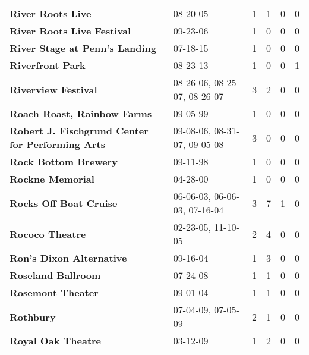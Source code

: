 \begin{supertabular}{llllll}
                                            \textbf{River Roots Live} &                      08-20-05 &  1 &   1 &  0 &  0 \\
                                   \textbf{River Roots Live Festival} &                      09-23-06 &  1 &   0 &  0 &  0 \\
                               \textbf{River Stage at Penn's Landing} &                      07-18-15 &  1 &   0 &  0 &  0 \\
                                             \textbf{Riverfront Park} &                      08-23-13 &  1 &   0 &  0 &  1 \\
                                          \textbf{Riverview Festival} &  08-26-06, 08-25-07, 08-26-07 &  3 &   2 &  0 &  0 \\
                                  \textbf{Roach Roast, Rainbow Farms} &                      09-05-99 &  1 &   0 &  0 &  0 \\
          \textbf{Robert  J.  Fischgrund  Center for Performing Arts} &  09-08-06, 08-31-07, 09-05-08 &  3 &   0 &  0 &  0 \\
                                         \textbf{Rock Bottom Brewery} &                      09-11-98 &  1 &   0 &  0 &  0 \\
                                             \textbf{Rockne Memorial} &                      04-28-00 &  1 &   0 &  0 &  0 \\
                                       \textbf{Rocks Off Boat Cruise} &  06-06-03, 06-06-03, 07-16-04 &  3 &   7 &  1 &  0 \\
                                              \textbf{Rococo Theatre} &            02-23-05, 11-10-05 &  2 &   4 &  0 &  0 \\
                                     \textbf{Ron's Dixon Alternative} &                      09-16-04 &  1 &   3 &  0 &  0 \\
                                           \textbf{Roseland Ballroom} &                      07-24-08 &  1 &   1 &  0 &  0 \\
                                            \textbf{Rosemont Theater} &                      09-01-04 &  1 &   1 &  0 &  0 \\
                                                    \textbf{Rothbury} &            07-04-09, 07-05-09 &  2 &   1 &  0 &  0 \\
                                           \textbf{Royal Oak Theatre} &                      03-12-09 &  1 &   2 &  0 &  0 \\

\end{supertabular}
